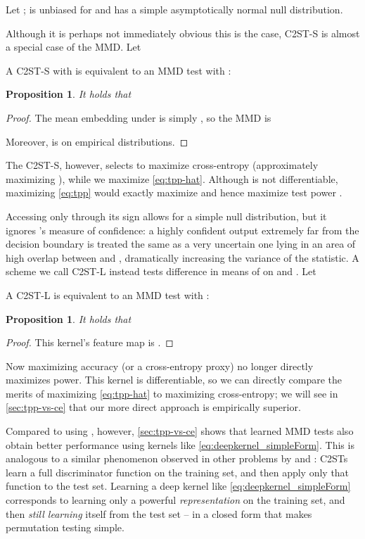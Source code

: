 \documentclass{article}
\newtheorem{prop}[theorem]{Proposition}  \crefname{prop}{Proposition}{Propositions}
\begin{document}
Let ;
 is unbiased for  and has a simple asymptotically normal null distribution.

Although it is perhaps not immediately obvious this is the case,
C2ST-S is almost a special case of the MMD.
Let
    
A C2ST-S with  is equivalent to an MMD test with :
\begin{prop} \label{thm:c2st-equiv}
    It holds that
    
\end{prop}
\begin{proof}
    The mean embedding  under 
    is simply ,
    so the MMD is
    
    Moreover,  is  on empirical distributions.
\end{proof}
The C2ST-S, however, selects  to maximize cross-entropy (approximately maximizing ),
while we maximize  \eqref{eq:tpp-hat}.
Although  is not differentiable,
maximizing \eqref{eq:tpp} would exactly maximize 
and hence maximize test power \citep[Theorem 1]{Lopez:C2ST}.



Accessing  only through its sign allows for a simple null distribution,
but it ignores 's measure of confidence:
a highly confident output extremely far from the decision boundary
is treated the same as a very uncertain one lying in an area of high overlap between  and ,
dramatically increasing the variance of the statistic.
A scheme we call C2ST-L instead
tests difference in means of  on  and  \citep{cheng:net-logits}.
Let
    
A C2ST-L is equivalent to an MMD test with :
\begin{prop} \label{thm:c2st-l-equiv}
    It holds that
    
\end{prop}
\begin{proof}
    This kernel's feature map is .
\end{proof}
Now maximizing accuracy (or a cross-entropy proxy) no longer directly maximizes power.
This kernel is differentiable,
so we can directly compare the merits of maximizing \eqref{eq:tpp-hat} to maximizing cross-entropy;
we will see in \cref{sec:tpp-vs-ce} that our more direct approach
is empirically superior.

Compared to using , however,
\cref{sec:tpp-vs-ce} shows that
learned MMD tests also obtain better performance using kernels like \eqref{eq:deepkernel_simpleForm}.
This is analogous to a similar phenomenon observed in other problems by \citet{MMD_GAN} and \citet{Kevin_ICML2019}:
C2STs learn a full discriminator function on the training set,
and then apply only that function to the test set.
Learning a deep kernel like \eqref{eq:deepkernel_simpleForm} corresponds to learning only a powerful \emph{representation} on the training set,
and then \emph{still learning}  itself from the test set
-- in a closed form that makes permutation testing simple.
\end{document}
